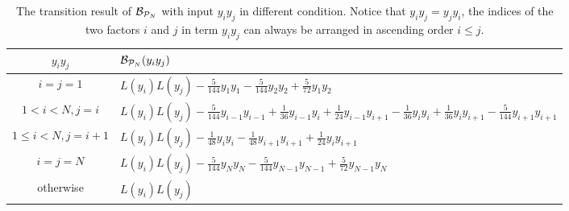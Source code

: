\documentclass[showpacs,twocolumn,aps,prx,long bibliography,superscriptaddress,notitlepage]{revtex4-1}
\begin{document}
\begin{table}
    \centering
    \renewcommand\arraystretch{2}
    \begin{tabular}{|c|l|}
        \hline$y_i y_j$ & $ \mathcal{B}_{\mathcal{P}_N} (y_i y_j) $ \\
        \hline$i=j=1$ & $L(y_i)L(y_j) -\frac{5}{144} y_1 y_1-\frac{5}{144} y_2 y_2+\frac{5}{72} y_1 y_2$ \\
        \hline $1<i<N, j=i$ & $L(y_i)L(y_j)-\frac{5}{144} y_{i-1} y_{i-1}+\frac{1}{36} y_{i-1} y_i+\frac{1}                           {24} y_{i-1} y_{i+1}-\frac{1}{36} y_i y_i+\frac{1}{36} y_i y_{i+1}-\frac{5}{144} y_{i+1} y_{i+1}$ \\
        \hline $1 \leq i<N, j=i+1$ & $L(y_i)L(y_j)-\frac{1}{48} y_i y_i-\frac{1}{48} y_{i+1} y_{i+1}+\frac{1}{24} y_i y_{i+1}$ \\
        \hline$i=j=N$ & $L(y_i)L(y_j)-\frac{5}{144} y_N y_N-\frac{5}{144} y_{N-1} y_{N-1}+\frac{5}{72} y_{N-1} y_N$ \\
        \hline otherwise & $L(y_i)L(y_j)$ \\
        \hline
    \end{tabular}
    \caption{The transition result of $\mathcal{B}_{\mathcal{P}_N}$ with input $y_iy_j$ in different condition. Notice that $y_i y_j = y_j y_i$, the indices of the two factors $i$ and $j$ in term $y_iy_j$ can always be arranged in ascending order $i\leq j$.}
    \label{table: transition table of teto}
\end{table}
\end{document}
